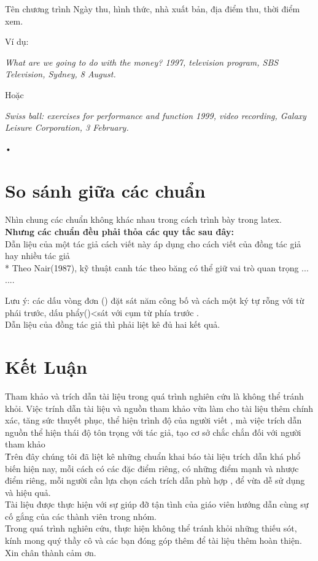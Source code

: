 \documentclass{hcmutarticle}
\begin{document}
Tên chương trình Ngày thu, hình thức, nhà xuất bản, địa điểm thu, thời điểm xem.

Ví dụ:

{\em What are we going to do with the money? 1997, television program, SBS Television, Sydney, 8 August.}

Hoặc

{\em Swiss ball: exercises for performance and function 1999, video recording, Galaxy Leisure Corporation, 3 February.}\begin{scriptsize}
•
\end{scriptsize}

\section{So sánh giữa các chuẩn  }\label{result}
Nhìn chung các chuẩn không khác nhau trong cách trình bày trong latex.\\
{\bfseries Nhưng các chuẩn đều phải thỏa các quy tắc sau đây:}\\
  Dẫn liệu của một tác giả 
 cách viết này áp dụng cho cách viết của đồng tác giả hay nhiều tác giả\\
* Theo Nair(1987), kỹ thuật canh tác theo băng có thể giữ vai trò quan trọng ...\\....


Lưu ý: các dấu vòng đơn () đặt sát năm công bố và cách một ký tự rỗng với từ phái trước, dấu phẩy()<sát với cụm từ phía trước .\\
Dẫn liệu của đồng tác giả
thì phải liệt kê đủ hai kết quả.


\section{Kết Luận }\label{result}
Tham khảo và trích dẫn tài liệu trong quá trình nghiên cứu là không thể tránh khỏi. Việc trính dẫn tài liệu và nguồn tham khảo vừa làm cho tài liệu thêm chính xác, tăng sức thuyết phục, thể hiện trình độ của người viết , mà việc trích dẫn nguồn thể hiện thái độ tôn trọng với tác giả, tạo cơ sở chắc chắn đối với người tham khảo\\\.
Trên đây chúng tôi đã liệt kê những chuẩn khai báo tài liệu trích dẫn khá phổ biến hiện nay, mỗi cách có các đặc điểm riêng, có những điểm mạnh và nhược điểm riêng, mỗi người cần lựa chọn cách trích dẫn phù hợp , để vừa dễ sử dụng và hiệu quả. \\
Tài liệu được thực hiện  với sự giúp đỡ tận tình của giáo viên hướng dẫn cùng sự cố gắng của các thành viên trong nhóm.\\
Trong quá trình nghiên cứu, thực hiện không thể tránh khỏi những  thiếu sót, kính mong quý thầy  cô và các bạn đóng góp thêm để tài liệu thêm hoàn thiện.\\
Xin chân thành cảm ơn.
\end{document}
